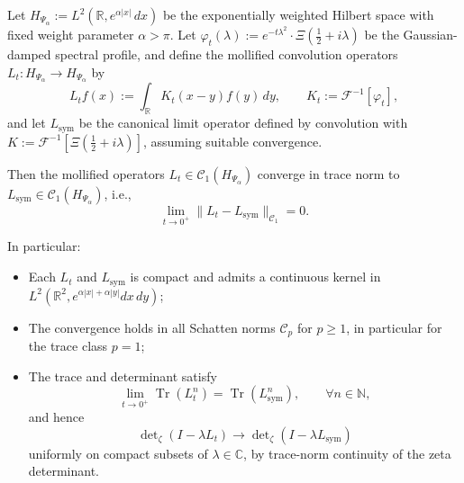 \begin{lemma}
\label{lem:kernel_trace_norm_convergence}
Let \( H_{\Psi_\alpha} := L^2(\mathbb{R}, e^{\alpha |x|} \, dx) \) be the exponentially weighted Hilbert space with fixed weight parameter \( \alpha > \pi \). Let \( \varphi_t(\lambda) := e^{-t\lambda^2} \cdot \Xi\left( \tfrac{1}{2} + i\lambda \right) \) be the Gaussian-damped spectral profile, and define the mollified convolution operators \( L_t \colon H_{\Psi_\alpha} \to H_{\Psi_\alpha} \) by
\[
L_t f(x) := \int_{\mathbb{R}} K_t(x - y) f(y) \, dy, \qquad K_t := \mathcal{F}^{-1}[\varphi_t],
\]
and let \( L_{\mathrm{sym}} \) be the canonical limit operator defined by convolution with \( K := \mathcal{F}^{-1}[\Xi(\tfrac{1}{2} + i\lambda)] \), assuming suitable convergence.

\medskip
\noindent
Then the mollified operators \( L_t \in \mathcal{C}_1(H_{\Psi_\alpha}) \) converge in trace norm to \( L_{\mathrm{sym}} \in \mathcal{C}_1(H_{\Psi_\alpha}) \), i.e.,
\[
\lim_{t \to 0^+} \| L_t - L_{\mathrm{sym}} \|_{\mathcal{C}_1} = 0.
\]

\medskip
\noindent
In particular:
\begin{itemize}
  \item Each \( L_t \) and \( L_{\mathrm{sym}} \) is compact and admits a continuous kernel in \( L^2(\mathbb{R}^2, e^{\alpha|x| + \alpha|y|} dx \, dy) \);
  \item The convergence holds in all Schatten norms \( \mathcal{C}_p \) for \( p \ge 1 \), in particular for the trace class \( p = 1 \);
  \item The trace and determinant satisfy
  \[
  \lim_{t \to 0^+} \operatorname{Tr}(L_t^n) = \operatorname{Tr}(L_{\mathrm{sym}}^n), \qquad \forall n \in \mathbb{N},
  \]
  and hence
  \[
  \det\nolimits_\zeta(I - \lambda L_t) \to \det\nolimits_\zeta(I - \lambda L_{\mathrm{sym}})
  \]
  uniformly on compact subsets of \( \lambda \in \mathbb{C} \), by trace-norm continuity of the zeta determinant.
\end{itemize}
\end{lemma}
